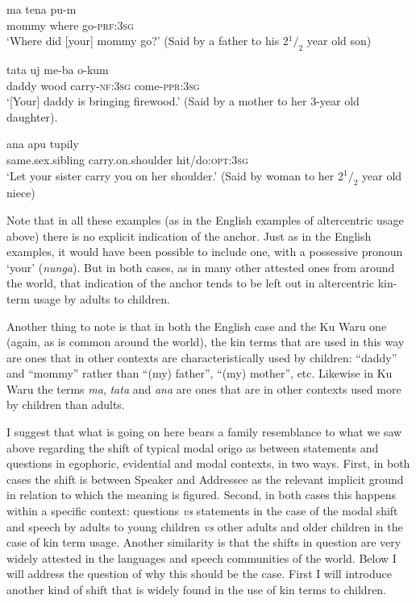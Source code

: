 \documentclass[output=paper]{langsci/langscibook}
\begin{document}
\begin{exe}
	\ex \label{ex:rumsey:ar17}
	\gll ma tena pu-m\\
	mommy where	go-\textsc{prf}:3\textsc{sg}\\
	\trans ‘Where did [your] mommy go?’  (Said by a father to his 2$^1/_2$ year old son)
\end{exe}

\begin{exe}
	\ex \label{ex:rumsey:ar18}
	\gll tata uj me-ba o-kum\\
	daddy wood carry-\textsc{nf}:3\textsc{sg} come-\textsc{ppr}:3\textsc{sg}\\
	\trans ‘[Your] daddy is bringing firewood.’ (Said by a mother to her 3-year old daughter).
\end{exe}

\begin{exe}
	\ex \label{ex:rumsey:ar19}
	\gll ana apu tupily\\
	same.sex.sibling carry.on.shoulder hit/do:\textsc{opt}:3\textsc{sg}\\
	\trans ‘Let your sister carry you on her shoulder.’ (Said by woman to her 2$^1/_2$ year old niece)
\end{exe}

Note that in all these examples (as in the English examples of altercentric usage above) there is no explicit indication of the anchor. Just as in the English examples, it would have been possible to include one, with a possessive pronoun ‘your’ (\textit{nunga}). But in both cases, as in many other attested ones from around the world, that indication of the anchor tends to be left out in altercentric kin-term usage by adults to children. 	

Another thing to note is that in both the English case and the Ku Waru one (again, as is common around the world), the kin terms that are used in this way are ones that in other contexts are characteristically used by children: “daddy” and “mommy” rather than “(my) father”, “(my) mother”, etc. Likewise in Ku Waru the terms \textit{ma}, \textit{tata} and \textit{ana} are ones that are in other contexts used more by children than adults. 

I suggest that what is going on here bears a family resemblance to what we saw above regarding the shift of typical modal origo as between statements and questions in egophoric, evidential and modal contexts, in two ways. First, in both cases the shift is between Speaker and Addressee as the relevant implicit ground in relation to which the meaning is figured.  Second, in both cases this happens within a specific context: questions \textit{vs} statements in the case of the modal shift and speech by adults to young children \textit{vs} other adults and older children in the case of kin term usage. Another similarity is that the shifts in question are very widely attested in the languages and speech communities of the world. Below I will address the question of why this should be the case. First I will introduce another kind of shift that is widely found in the use of kin terms to children.
\end{document}
